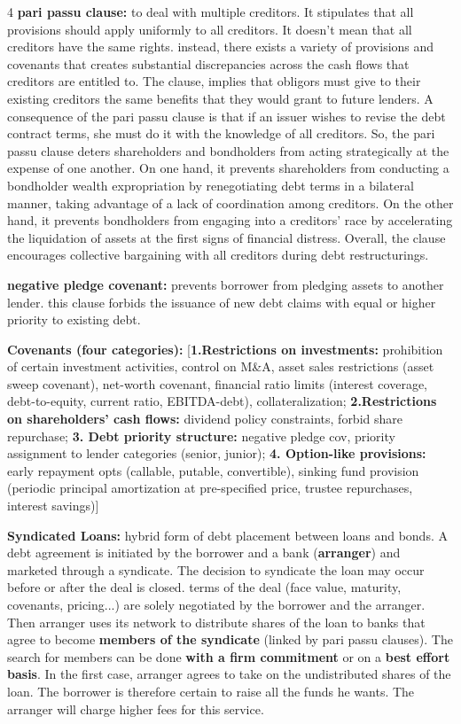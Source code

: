 \documentclass[landscape]{article}
\newcommand{\concept}[1]{\textcolor{conceptcolor}{\textbf{#1}}}
\newcommand{\keyterm}[1]{\textcolor{keycolor}{\textbf{#1}}}
\begin{document}
\begin{multicols}{4}
\keyterm{pari passu clause:} to deal with multiple creditors. It stipulates that all provisions should apply uniformly to all creditors. It doesn't mean that all creditors have the same rights. instead, there exists a variety of provisions and covenants that creates substantial discrepancies across the cash flows that creditors are entitled to. The clause, implies that obligors must give to their existing creditors the same benefits that they would grant to future lenders. A consequence of the pari passu clause is that if an issuer wishes to revise the debt contract terms, she must do it with the knowledge of all creditors.
So, the pari passu clause deters shareholders and bondholders from acting strategically at the expense of one another. On one hand, it prevents shareholders from conducting a bondholder wealth expropriation by renegotiating debt terms in a bilateral manner, taking advantage of a lack of coordination among creditors. On the other hand, it prevents bondholders from engaging into a creditors' race by accelerating the liquidation of assets at the first signs of financial distress. Overall, the clause encourages collective bargaining with all creditors during debt restructurings.

\keyterm{negative pledge covenant:} prevents borrower from pledging assets to another lender. this clause forbids the issuance of new debt claims with equal or higher priority to existing debt.

\textbf{Covenants (four categories):} [\concept{1.Restrictions on investments:} prohibition of certain investment activities, control on M\&A, asset sales restrictions (asset sweep covenant), net-worth covenant, financial ratio limits (interest coverage, debt-to-equity, current ratio, EBITDA-debt), collateralization; \concept{2.Restrictions on shareholders' cash flows:} dividend policy constraints, forbid share repurchase; \concept{3. Debt priority structure:} negative pledge cov, priority assignment to lender categories (senior, junior); \concept{4. Option-like provisions:} early repayment opts (callable, putable, convertible), sinking fund provision (periodic principal amortization at pre-specified price, trustee repurchases, interest savings)]

\textcolor{subsubsectioncolor}{\textbf{Syndicated Loans:}} hybrid form of debt placement between loans and bonds. A debt agreement is initiated by the borrower and a bank (\textbf{arranger}) and marketed through a syndicate. The decision to syndicate the loan may occur before or after the deal is closed.  terms of the deal (face value, maturity, covenants, pricing...) are solely negotiated by the borrower and the arranger.
Then arranger uses its network to distribute shares of the loan to banks that agree to become \textbf{members of the syndicate} (linked by pari passu clauses). The search for members can be done \textbf{with a firm commitment} or on a \textbf{best effort basis}. In the first case, arranger agrees to take on the undistributed shares of the loan. The borrower is therefore certain to raise all the funds he wants. The arranger will charge higher fees for this service.


\end{multicols}
\end{document}
